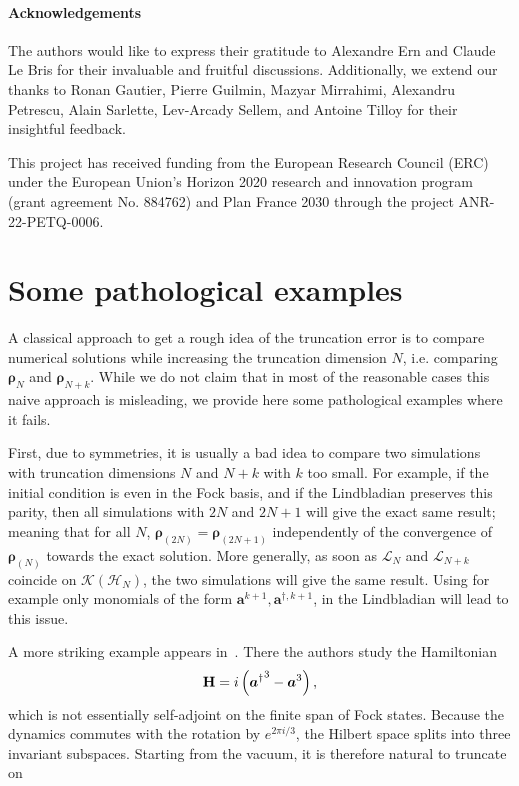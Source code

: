 \documentclass[a4paper,onecolumn,amsmath,amssymb,amsfonts,accepted=2026-03-06]{quantumarticle}
\newcommand{\xL}{\mathcal{L}}
\newcommand{\xH}{\mathcal{H}}
\newcommand{\xK}{\mathcal{K}}
\newcommand{\Hamil}{{\bf H}}
\newcommand{\rN}{{\boldsymbol{\rho}_{(N)}}}
\begin{document}
\paragraph{Acknowledgements}

The authors would like to express their gratitude to Alexandre Ern and Claude Le Bris for their invaluable and fruitful discussions. Additionally, we extend our thanks to Ronan Gautier, Pierre Guilmin, Mazyar Mirrahimi, Alexandru Petrescu, Alain Sarlette, Lev-Arcady Sellem, and Antoine Tilloy for their insightful feedback.

This project has received
funding from the European Research Council (ERC) under the European Union’s Horizon
2020 research and innovation program (grant agreement No. 884762) and Plan France 2030 through the project ANR-22-PETQ-0006.
\appendix
{}
\section{Some pathological examples}
\label{sec:pathological}
A classical approach to get a rough idea of the truncation error is to compare numerical solutions while increasing the truncation dimension $N$, i.e. comparing $\boldsymbol{\rho}_N$ and $\boldsymbol{\rho}_{N+k}$. While we do not claim that in most of the reasonable cases this naive approach is misleading, we provide here some pathological examples where it fails.

First, due to symmetries, it is usually a bad idea to compare two simulations with truncation dimensions $N$ and $N+k$ with $k$ too small. For example, if the initial condition is even in the Fock basis, and if the Lindbladian preserves this parity, then all simulations with $2N$ and $2N+1$ will give the exact same result; meaning that for all $N$, $\boldsymbol{\rho}_{(2N)}=\boldsymbol{\rho}_{(2N+1)}$ independently of the convergence of $\rN$ towards the exact solution. More generally, as soon as $\xL_N$ and $\xL_{N+k}$ coincide on $\xK(\xH_N)$, the two simulations will give the same result. Using for example only monomials of the form $\boldsymbol{a}^{k+1}, \boldsymbol{a}^{\dagger, k+1}$, in the Lindbladian will lead to this issue. 


A more striking example appears in~\cite{ashhab2025finitedimensionalapproximationsgeneralizedsqueezing}. There the authors study the Hamiltonian
\begin{equation*}
    \Hamil = i \left({\boldsymbol{a}^\dagger}^3 - \boldsymbol{a}^3\right),
\end{equation*}
which is not essentially self-adjoint on the finite span of Fock states. Because the dynamics commutes with the rotation by $e^{2\pi i/3}$, the Hilbert space splits into three invariant subspaces. Starting from the vacuum, it is therefore natural to truncate on
\end{document}
